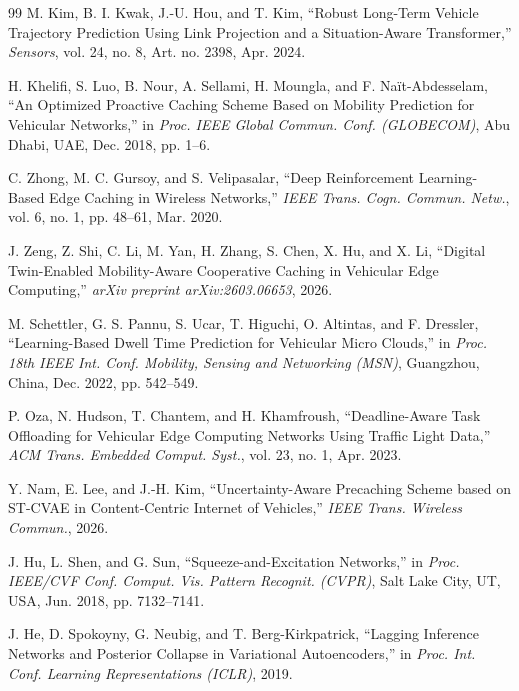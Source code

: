 \documentclass[journal]{IEEEtran}
\begin{document}
\begin{thebibliography}{99}
 M. Kim, B. I. Kwak, J.-U. Hou, and T. Kim, ``Robust Long-Term Vehicle Trajectory Prediction Using Link Projection and a Situation-Aware Transformer,'' \emph{Sensors}, vol. 24, no. 8, Art. no. 2398, Apr. 2024.

 H. Khelifi, S. Luo, B. Nour, A. Sellami, H. Moungla, and F. Na{\"i}t-Abdesselam, ``An Optimized Proactive Caching Scheme Based on Mobility Prediction for Vehicular Networks,'' in \emph{Proc. IEEE Global Commun. Conf. (GLOBECOM)}, Abu Dhabi, UAE, Dec. 2018, pp. 1--6.

 C. Zhong, M. C. Gursoy, and S. Velipasalar, ``Deep Reinforcement Learning-Based Edge Caching in Wireless Networks,'' \emph{IEEE Trans. Cogn. Commun. Netw.}, vol. 6, no. 1, pp. 48--61, Mar. 2020.

 J. Zeng, Z. Shi, C. Li, M. Yan, H. Zhang, S. Chen, X. Hu, and X. Li, ``Digital Twin-Enabled Mobility-Aware Cooperative Caching in Vehicular Edge Computing,'' \emph{arXiv preprint arXiv:2603.06653}, 2026.

 M. Schettler, G. S. Pannu, S. Ucar, T. Higuchi, O. Altintas, and F. Dressler, ``Learning-Based Dwell Time Prediction for Vehicular Micro Clouds,'' in \emph{Proc. 18th IEEE Int. Conf. Mobility, Sensing and Networking (MSN)}, Guangzhou, China, Dec. 2022, pp. 542--549.

 P. Oza, N. Hudson, T. Chantem, and H. Khamfroush, ``Deadline-Aware Task Offloading for Vehicular Edge Computing Networks Using Traffic Light Data,'' \emph{ACM Trans. Embedded Comput. Syst.}, vol. 23, no. 1, Apr. 2023.

 Y. Nam, E. Lee, and J.-H. Kim, ``Uncertainty-Aware Precaching Scheme based on ST-CVAE in Content-Centric Internet of Vehicles,'' \emph{IEEE Trans. Wireless Commun.}, 2026.

 J. Hu, L. Shen, and G. Sun, ``Squeeze-and-Excitation Networks,'' in \emph{Proc. IEEE/CVF Conf. Comput. Vis. Pattern Recognit. (CVPR)}, Salt Lake City, UT, USA, Jun. 2018, pp. 7132--7141.

J. He, D. Spokoyny, G. Neubig, and T. Berg-Kirkpatrick, ``Lagging Inference Networks and Posterior Collapse in Variational Autoencoders,'' in \emph{Proc. Int. Conf. Learning Representations (ICLR)}, 2019.


\end{thebibliography}
\end{document}
